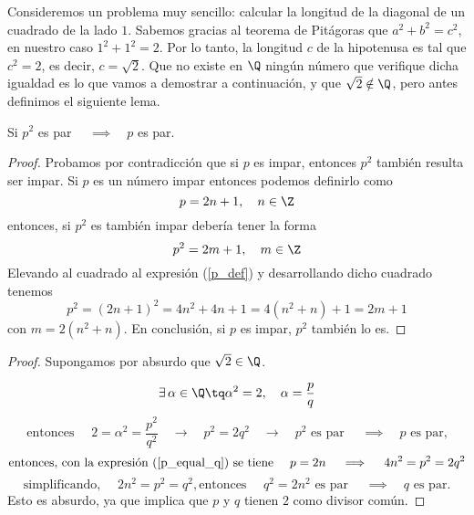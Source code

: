 Consideremos un problema muy sencillo: calcular la longitud de la diagonal de un cuadrado de la lado $1$. Sabemos gracias al teorema de Pitágoras que $a^2 + b^2 = c^2$, en nuestro caso $1^2 + 1^2 = 2$. Por lo tanto, la longitud $c$ de la hipotenusa es tal que $c^2 = 2$, es decir, $c = \sqrt{2}$. Que no existe en $\Q$ ningún número que verifique dicha igualdad es lo que vamos a demostrar a continuación, y que $\sqrt{2}\notin\Q$, pero antes definimos el siguiente lema.
\begin{lema}
    Si $p^2$ es par $\quad\implies\quad p$ es par. 
\end{lema}
\begin{proof}
    Probamos por contradicción que si $p$ es impar, entonces $p^2$ también resulta ser impar. Si $p$ es un número impar entonces podemos definirlo como 
    \begin{equation}
        \label{p_def}
        p = 2n + 1, \quad n\in\Z
    \end{equation}
    entonces, si $p^2$ es también impar debería tener la forma 
    \begin{equation}
        p^2 = 2m + 1, \quad m\in\Z
    \end{equation}
    Elevando al cuadrado al expresión (\ref{p_def}) y desarrollando dicho cuadrado tenemos
    \begin{equation}
        p^2 = \left( 2n + 1 \right)^2 = 4n^2 + 4n + 1 = 4\left( n^2 + n \right) + 1 = 2m + 1
    \end{equation}
    con $m = 2\left( n^2 + n \right) $. En conclusión, si $p$ es impar, $p^2$ también lo es.
    
\end{proof}
\begin{proof}
    Supongamos por absurdo que $\sqrt{2} \in\Q$.

    \begin{equation}
        \exists\, \alpha\in\Q\tq\alpha^2 = 2, \quad \alpha = \frac{p}{q}
    \end{equation}
    \begin{equation}
        \label{p_equal_q}
        \textrm{entonces } \quad 2 = \alpha^2 = \frac{p^2}{q^2}\quad\rightarrow\quad p^2 = 2q^2 \quad\rightarrow\quad p^2\textrm{ es par }\quad\implies\quad p\textrm{ es par,}
    \end{equation}
    \begin{equation}
        \textrm{entonces, con la expresión (\ref{p_equal_q}) se tiene } \quad p = 2n\quad\implies\quad 4n^2 = p^2 = 2q^2
    \end{equation}
    \begin{equation}
        \textrm{simplificando, }\quad 2n^2 = p^2 = q^2, \textrm{entonces }\quad q^2 = 2n^2\textrm{ es par }\quad\implies\quad q\textrm{ es par.}
    \end{equation}
    Esto es absurdo, ya que implica que $p$ y $q$ tienen $2$ como divisor común.
\end{proof}

